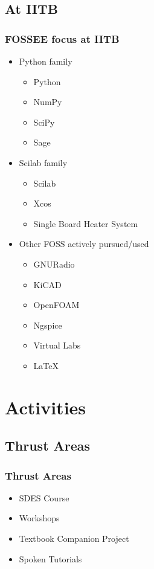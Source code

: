 \documentclass[compress,red]{beamer} %
\begin{document}
\subsection{At IITB}
\begin{frame}
\frametitle{FOSSEE focus at IITB}
\begin{itemize}
\item Python family \pause
   \begin{itemize}
   \item Python
   \item NumPy
   \item SciPy
   \item Sage \pause
   \end{itemize}
\item Scilab family \pause
   \begin{itemize}
   \item Scilab
   \item Xcos 
   \item Single Board Heater System \pause
   \end{itemize}
\item Other FOSS actively pursued/used \pause
   \begin{itemize}
   \item GNURadio
   \item KiCAD
   \item OpenFOAM
   \item Ngspice
   \item Virtual Labs
   \item \LaTeX %
   \end{itemize}
\end{itemize}
\end{frame}

\section{Activities}

\subsection{Thrust Areas}
\begin{frame}
\frametitle{Thrust Areas}
\begin{itemize}
\item SDES Course \pause
\item Workshops  \pause
\item Textbook Companion Project  \pause
\item Spoken Tutorials \pause
\end{itemize}
\end{frame}
\end{document}
